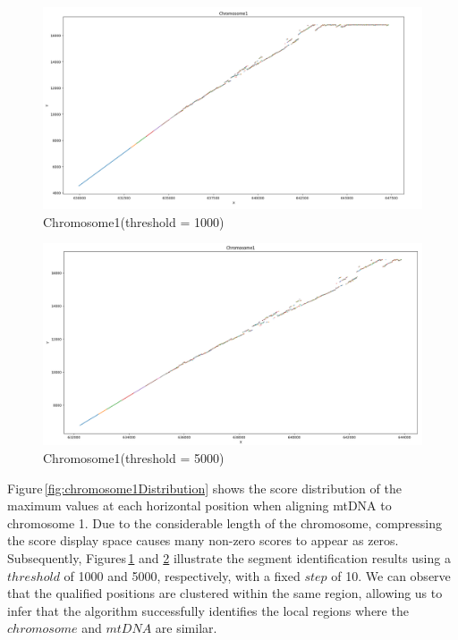 \documentclass[PhD]{PHlab-thesis}
\begin{document}
\begin{figure}[htbp]
    \centering
    \includegraphics[width=1\linewidth]{figures/chromosome1threshold 1000.png}
    \caption{Chromosome1(threshold = 1000)}
    \label{fig:chromosome1threshold1000}
\end{figure}

\begin{figure}[htbp]
    \centering
    \includegraphics[width=1\linewidth]{figures/chromosome1threshold 5000.png}
    \caption{Chromosome1(threshold = 5000)}
    \label{fig:chromosome1threshold5000}
\end{figure}

Figure \ref{fig:chromosome1Distribution} shows the score distribution of the maximum values at each horizontal position when aligning mtDNA to chromosome 1. Due to the considerable length of the chromosome, compressing the score display space causes many non-zero scores to appear as zeros. Subsequently, Figures \ref{fig:chromosome1threshold1000} and \ref{fig:chromosome1threshold5000} illustrate the segment identification results using a $threshold$ of 1000 and 5000, respectively, with a fixed $step$ of 10. We can observe that the qualified positions are clustered within the same region, allowing us to infer that the algorithm successfully identifies the local regions where the $chromosome$ and $mtDNA$ are similar.
\end{document}
